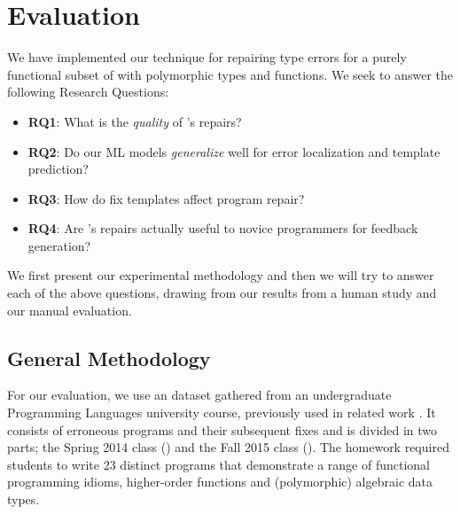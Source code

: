 \section{Evaluation}
\label{sec:eval}

\lstMakeShortInline[mathescape=true]{|}


We have implemented our technique for repairing type errors for a purely
functional subset of \ocaml with polymorphic types and functions. We seek to
answer the following Research Questions:

\begin{itemize}
    \item \textbf{RQ1}: What is the \emph{quality} of \toolname's repairs?
    \item \textbf{RQ2}: Do our ML models \emph{generalize} well for error
    localization and template prediction?
    \item \textbf{RQ3}: How do fix templates affect program repair?
    \item \textbf{RQ4}: Are \toolname's repairs actually useful to novice programmers
    for feedback generation?
\end{itemize}

We first present our experimental methodology and then we will try to answer
each of the above questions, drawing from our results from a human study and our
manual evaluation.


\subsection{General Methodology}
\label{sec:eval:gen_method}
For our evaluation, we use an \ocaml dataset gathered from an undergraduate
Programming Languages university course, previously used in related work
\citep{yunounderstand,Seidel:2017}. It consists of erroneous programs and their
subsequent fixes and is divided in two parts; the Spring 2014 class (\SPRING)
and the Fall 2015 class (\FALL). The homework required students to write 23
distinct programs that demonstrate a range of functional programming idioms, \eg
higher-order functions and (polymorphic) algebraic data types.

